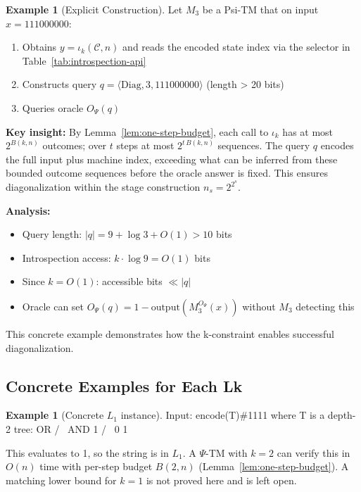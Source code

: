 \documentclass[11pt]{article}
\theoremstyle{definition}
\newtheorem{example}[theorem]{Example}
\newcommand{\PSi}{\Psi}
\begin{document}
\begin{example}[Explicit Construction]
\label{ex:concrete-diagonalization}
Let $M_3$ be a Psi-TM that on input $x = 111000000$:
\begin{enumerate}
\item Obtains $y=\iota_k(\mathcal{C},n)$ and reads the encoded state index via the selector in Table~\ref{tab:introspection-api}
\item Constructs query $q = \langle \text{Diag}, 3, 111000000 \rangle$ (length > 20 bits)
\item Queries oracle $O_\Psi(q)$
\end{enumerate}

\textbf{Key insight:} By Lemma~\ref{lem:one-step-budget}, each call to $\iota_k$ has at most $2^{B(k,n)}$ outcomes; over $t$ steps at most $2^{t\,B(k,n)}$ sequences. The query $q$ encodes the full input plus machine index, exceeding what can be inferred from these bounded outcome sequences before the oracle answer is fixed. This ensures diagonalization within the stage construction $n_s=2^{2^s}$.

\textbf{Analysis:}
\begin{itemize}
\item Query length: $|q| = 9 + \log 3 + O(1) > 10$ bits
\item Introspection access: $k \cdot \log 9 = O(1)$ bits
\item Since $k = O(1)$: accessible bits $\ll |q|$
\item Oracle can set $O_\Psi(q) = 1 - \text{output}(M_3^{O_\Psi}(x))$ without $M_3$ detecting this
\end{itemize}

This concrete example demonstrates how the k-constraint enables successful diagonalization.
\end{example}

\subsection{Concrete Examples for Each Lk}

\begin{example}[Concrete $L_1$ instance]
Input: encode(T)\#1111 where T is a depth-2 tree:
       OR
      /  \
    AND   1
    / \
   0   1
   
This evaluates to 1, so the string is in $L_1$.
A $\PSi$-TM with $k=2$ can verify this in $O(n)$ time with per-step budget $B(2,n)$ (Lemma~\ref{lem:one-step-budget}). A matching lower bound for $k=1$ is not proved here and is left open.
\end{example}
\end{document}
